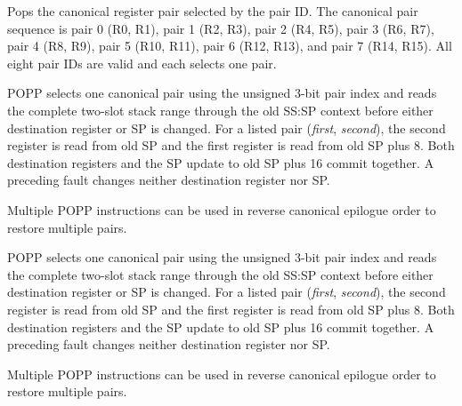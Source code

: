 Pops the canonical register pair selected by the pair ID. The canonical pair sequence is pair 0 (R0, R1), pair 1 (R2, R3), pair 2 (R4, R5), pair 3 (R6, R7), pair 4 (R8, R9), pair 5 (R10, R11), pair 6 (R12, R13), and pair 7 (R14, R15). All eight pair IDs are valid and each selects one pair.

POPP selects one canonical pair using the unsigned 3-bit pair index and reads the complete two-slot stack range
through the old SS:SP context before either destination register or SP is changed. For a listed pair
(\emph{first}, \emph{second}), the second register is read from old SP and the first register is read from old SP
plus 8. Both destination registers and the SP update to old SP plus 16 commit together. A preceding fault changes
neither destination register nor SP.

Multiple POPP instructions can be used in reverse canonical epilogue order to restore multiple pairs.

POPP selects one canonical pair using the unsigned 3-bit pair index and reads the complete two-slot stack range
through the old SS:SP context before either destination register or SP is changed. For a listed pair
(\emph{first}, \emph{second}), the second register is read from old SP and the first register is read from old SP
plus 8. Both destination registers and the SP update to old SP plus 16 commit together. A preceding fault changes
neither destination register nor SP.

Multiple POPP instructions can be used in reverse canonical epilogue order to restore multiple pairs.
